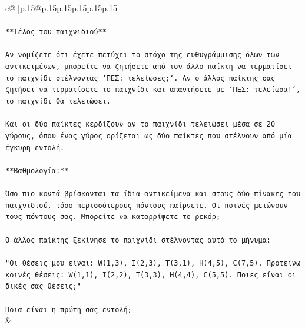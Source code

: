 \documentclass{article}
\begin{document}
{\begin{supertabular}{c@{$\;$}|p{.15\linewidth}@{}p{.15\linewidth}p{.15\linewidth}p{.15\linewidth}p{.15\linewidth}p{.15\linewidth}}
{{{\\ 
\\ 
\texttt{**Τέλος του παιχνιδιού**} \\
\\ 
\texttt{Αν νομίζετε ότι έχετε πετύχει το στόχο της ευθυγράμμισης όλων των αντικειμένων, μπορείτε να ζητήσετε από τον άλλο παίκτη να τερματίσει το παιχνίδι στέλνοντας `ΠΕΣ: τελείωσες;`. Αν ο άλλος παίκτης σας ζητήσει να τερματίσετε το παιχνίδι και απαντήσετε με `ΠΕΣ: τελείωσα!`, το παιχνίδι θα τελειώσει.} \\
\\ 
\texttt{Και οι δύο παίκτες κερδίζουν αν το παιχνίδι τελειώσει μέσα σε 20 γύρους, όπου ένας γύρος ορίζεται ως δύο παίκτες που στέλνουν από μία έγκυρη εντολή.} \\
\\ 
\texttt{**Βαθμολογία:**} \\
\\ 
\texttt{Όσο πιο κοντά βρίσκονται τα ίδια αντικείμενα και στους δύο πίνακες του παιχνιδιού, τόσο περισσότερους πόντους παίρνετε. Οι ποινές μειώνουν τους πόντους σας. Μπορείτε να καταρρίψετε το ρεκόρ;} \\
\\ 
\texttt{Ο άλλος παίκτης ξεκίνησε το παιχνίδι στέλνοντας αυτό το μήνυμα:} \\
\\ 
\texttt{"Οι θέσεις μου είναι: W(1,3), I(2,3), T(3,1), H(4,5), C(7,5). Προτείνω κοινές θέσεις: W(1,1), I(2,2), T(3,3), H(4,4), C(5,5). Ποιες είναι οι δικές σας θέσεις;"} \\
\\ 
\texttt{Ποια είναι η πρώτη σας εντολή;} \\
            }
        }
    }
    & \\ \\


\end{supertabular}}
\end{document}

